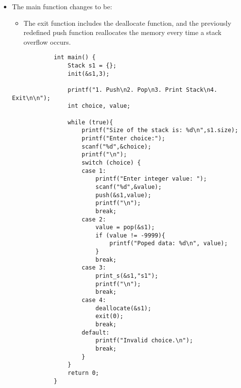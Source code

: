 \begin{itemize}
\begin{verbatim}
            int pop(Stack *sp){
                if (sp->top == -1){
                    printf("Stack underflow.\n");
                    return -9999;
                }
                --sp->top; // don't mind 
                return sp->item[sp->top + 1];
            }

            void init(Stack *sp, int size){
                sp->top = -1;
                sp->item = (int*) malloc(size * sizeof(int));
                if (sp->item == NULL){
                    printf("Error.\n");
                    exit(1);
                }
                sp->size = size;
            }

            void print_s(Stack *sp, const char str[]){
                printf("%s:\n",str);
                for (int i = 0; i < sp->size; i++) {
                    printf("\t[%d]: %d\n",i,sp->item[i]);
                }
            }

            void deallocate(Stack *sp){
                if (sp->item != NULL)
                    free(sp->item);
                sp->top = -1; 
                sp->size = 0;
            }
        \end{verbatim}
    
    \item The main function changes to be:
        \begin{itemize}
            \item The exit function includes the deallocate function, and the previously redefined push function reallocates the memory every time a stack overflow occurs.
        \end{itemize}
        \begin{verbatim}
            int main() {
                Stack s1 = {}; 
                init(&s1,3);

                printf("1. Push\n2. Pop\n3. Print Stack\n4. Exit\n\n");
                int choice, value; 

                while (true){
                    printf("Size of the stack is: %d\n",s1.size);
                    printf("Enter choice:");
                    scanf("%d",&choice);
                    printf("\n");
                    switch (choice) {
                    case 1:
                        printf("Enter integer value: ");
                        scanf("%d",&value);
                        push(&s1,value);
                        printf("\n");
                        break;
                    case 2:
                        value = pop(&s1);
                        if (value != -9999){
                            printf("Poped data: %d\n", value);
                        }
                        break; 
                    case 3:
                        print_s(&s1,"s1");
                        printf("\n");
                        break; 
                    case 4: 
                        deallocate(&s1);
                        exit(0);
                        break;
                    default:
                        printf("Invalid choice.\n");
                        break;
                    }
                }
                return 0;
            }
        \end{verbatim}
    

\end{itemize}
